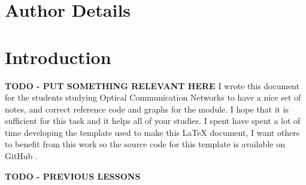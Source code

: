 \documentclass[colorlinks,11pt,a4paper,normalphoto,withhyper,ragged2e]{altareport}
\begin{document}
\MakeReportTitlePage


\setcounter{page}{1}






\section*{Author Details}
\makeauthordetails

\setcounter{tocdepth}{2} 
\tableofcontents %





\section*{Introduction}
\textbf{TODO - PUT SOMETHING RELEVANT HERE}
I wrote this document for the students studying Optical Communication Networks to have a nice set of notes, and correct reference code and graphs for the module. I hope that it is sufficient for this task and it helps all of your studies. \linebreak
I spent have spent a lot of time developing the template used to make this {\LaTeX} document, I want others to benefit from this work so the source code for this template is available on GitHub \cite{latex_template_github}.
\newpage
{} %





\textbf{TODO - PREVIOUS LESSONS} \linebreak
\end{document}
